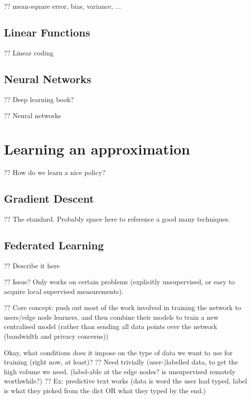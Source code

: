 ?? mean-square error, bias, variance, ...

\subsection{Linear Functions}

?? Linear coding

\subsection{Neural Networks}

?? Deep learning book?~\cite{DBLP:books/daglib/0040158}

?? Neural networks

\section{Learning an approximation}

?? How do we learn a nice policy?

\subsection{Gradient Descent}

?? The standard. Probably space here to reference a good many techniques.

\subsection{Federated Learning}

?? Describe it here

?? Issue? Only works on certain problems (explicitly unsupervised, or easy to acquire local supervised measurements).

?? Core concept: push out most of the work involved in training the network to users/edge node learners, and then combine their models to train a new centralised model (rather than sending all data points over the network (bandwidth and privacy concerns))

Okay, what conditions does it impose on the type of data we want to use for training (right now, at least)?
?? Need trivially (user-)labelled data, to get the high volume we need. (label-able at the edge nodes? is unsupervised remotely worthwhile?)
?? Ex: predictive text works (data is word the user had typed, label is what they picked from the dict OR what they typed by the end.)

